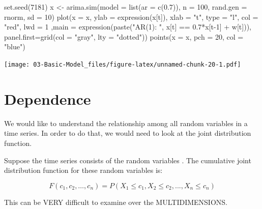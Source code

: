 \documentclass[
]{book}
\newenvironment{Shaded}{\begin{snugshade}}{\end{snugshade}}
\newcommand{\AttributeTok}[1]{\textcolor[rgb]{0.77,0.63,0.00}{#1}}
\newcommand{\DecValTok}[1]{\textcolor[rgb]{0.00,0.00,0.81}{#1}}
\newcommand{\FloatTok}[1]{\textcolor[rgb]{0.00,0.00,0.81}{#1}}
\newcommand{\FunctionTok}[1]{\textcolor[rgb]{0.00,0.00,0.00}{#1}}
\newcommand{\NormalTok}[1]{#1}
\newcommand{\OtherTok}[1]{\textcolor[rgb]{0.56,0.35,0.01}{#1}}
\newcommand{\SpecialCharTok}[1]{\textcolor[rgb]{0.00,0.00,0.00}{#1}}
\newcommand{\StringTok}[1]{\textcolor[rgb]{0.31,0.60,0.02}{#1}}
\theoremstyle{definition}
\theoremstyle{definition}
\theoremstyle{definition}
\theoremstyle{definition}
\theoremstyle{remark}
\begin{document}
\begin{Shaded}
\begin{Highlighting}[]
\FunctionTok{set.seed}\NormalTok{(}\DecValTok{7181}\NormalTok{)}
\NormalTok{x }\OtherTok{\textless{}{-}} \FunctionTok{arima.sim}\NormalTok{(}\AttributeTok{model =} \FunctionTok{list}\NormalTok{(}\AttributeTok{ar =} \FunctionTok{c}\NormalTok{(}\FloatTok{0.7}\NormalTok{)), }\AttributeTok{n =} \DecValTok{100}\NormalTok{, }
    \AttributeTok{rand.gen =}\NormalTok{ rnorm, }\AttributeTok{sd =} \DecValTok{10}\NormalTok{)}
\FunctionTok{plot}\NormalTok{(}\AttributeTok{x =}\NormalTok{ x, }\AttributeTok{ylab =} \FunctionTok{expression}\NormalTok{(x[t]), }\AttributeTok{xlab =} \StringTok{"t"}\NormalTok{, }\AttributeTok{type =} 
    \StringTok{"l"}\NormalTok{, }\AttributeTok{col =} \StringTok{"red"}\NormalTok{, }\AttributeTok{lwd =} \DecValTok{1}\NormalTok{ ,}\AttributeTok{main =} 
    \FunctionTok{expression}\NormalTok{(}\FunctionTok{paste}\NormalTok{(}\StringTok{"AR(1): "}\NormalTok{, x[t] }\SpecialCharTok{==} \FloatTok{0.7}\SpecialCharTok{*}\NormalTok{x[t}\DecValTok{{-}1}\NormalTok{] }\SpecialCharTok{+} 
\NormalTok{    w[t])), }\AttributeTok{panel.first=}\FunctionTok{grid}\NormalTok{(}\AttributeTok{col =} \StringTok{"gray"}\NormalTok{, }\AttributeTok{lty =} 
    \StringTok{"dotted"}\NormalTok{))}
\FunctionTok{points}\NormalTok{(}\AttributeTok{x =}\NormalTok{ x, }\AttributeTok{pch =} \DecValTok{20}\NormalTok{, }\AttributeTok{col =} \StringTok{"blue"}\NormalTok{)}
\end{Highlighting}
\end{Shaded}

\texttt{[image: 03-Basic-Model\_files/figure-latex/unnamed-chunk-20-1.pdf]}

\hypertarget{dependence}{%
\chapter{Dependence}\label{dependence}}

We would like to understand the relationship among all random variables in a time series. In order to do that, we would need to look at the joint distribution function.

Suppose the time series consists of the random variables . The cumulative joint distribution function for these random variables is:

\[ F(c_1, c_2, …, c_n) = P(X_1\leq{c_1},X_2\leq{c_2},...,X_n\leq{c_n}) \]

This can be VERY difficult to examine over the MULTIDIMENSIONS.
\end{document}
